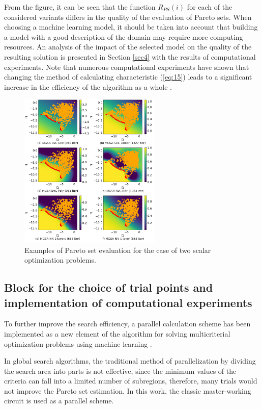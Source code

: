 \documentclass[runningheads]{llncs}
\begin{document}
From the figure, it can be seen that the function $R_{PS}(i)$ for each of the considered variants differs in the quality of the evaluation of Pareto sets. When choosing a machine learning model, it should be taken into account that building a model with a good description of the domain may require more computing resources. An analysis of the impact of the selected model on the quality of the resulting solution is presented in Section \ref{sec4} with the results of computational experiments. Note that numerous computational experiments have shown that changing the method of calculating characteristic (\ref{eq:15}) leads to a significant increase in the efficiency of the algorithm as a whole \cite{Konnov2025,MCO_ML_2023}.

\begin{figure}
\center
\includegraphics[width=0.6\textwidth]{fig4.png}
\caption{Examples of Pareto set evaluation for the case of two scalar optimization problems.} \label{fig4}
\end{figure}


\subsection{Block for the choice of trial points and implementation of computational experiments}
\label{subsec35}

To further improve the search efficiency, a parallel calculation scheme has been implemented as a new element of the algorithm for solving multicriterial optimization problems using machine learning \cite{ioptmco}. 

In global search algorithms, the traditional method of parallelization by dividing the search area into parts is not effective, since the minimum values of the criteria can fall into a limited number of subregions, therefore, many trials would not improve the Pareto set estimation. 
In this work, the classic master-working circuit is used as a parallel scheme. 
\end{document}
